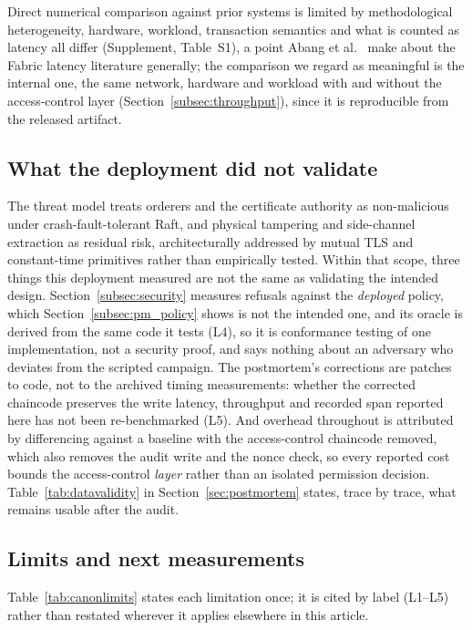 \documentclass[a4paper,fleqn]{cas-sc}
\begin{document}
Direct numerical comparison against prior systems is limited by
methodological heterogeneity, hardware, workload, transaction semantics
and what is counted as latency all differ (Supplement, Table~S1), a point
Abang et al.~\cite{abang2024latency} make about the Fabric latency
literature generally; the comparison we regard as meaningful is the
internal one, the same network, hardware and workload with and without
the access-control layer (Section~\ref{subsec:throughput}), since it is
reproducible from the released artifact.

\subsection{What the deployment did not validate}
\label{subsec:notvalidated}

The threat model treats orderers and the certificate authority as
non-malicious under crash-fault-tolerant Raft, and physical tampering and
side-channel extraction as residual risk, architecturally addressed by
mutual TLS and constant-time primitives rather than empirically tested.
Within that scope, three things this deployment measured are not the same
as validating the intended design. Section~\ref{subsec:security} measures
refusals against the \emph{deployed} policy, which
Section~\ref{subsec:pm_policy} shows is not the intended one, and its
oracle is derived from the same code it tests (L4), so it is conformance
testing of one implementation, not a security proof, and says nothing
about an adversary who deviates from the scripted campaign. The
postmortem's corrections are patches to code, not to the archived timing
measurements: whether the corrected chaincode preserves the write latency,
throughput and recorded span reported here has not been re-benchmarked
(L5). And overhead throughout is attributed by differencing against a
baseline with the access-control chaincode removed, which also removes the
audit write and the nonce check, so every reported cost bounds the
access-control \emph{layer} rather than an isolated permission decision.
Table~\ref{tab:datavalidity} in Section~\ref{sec:postmortem} states, trace
by trace, what remains usable after the audit.

\subsection{Limits and next measurements}
\label{subsec:limits}
\label{subsec:threats}

Table~\ref{tab:canonlimits} states each limitation once; it is cited by
label (L1--L5) rather than restated wherever it applies elsewhere in this
article.
\end{document}
